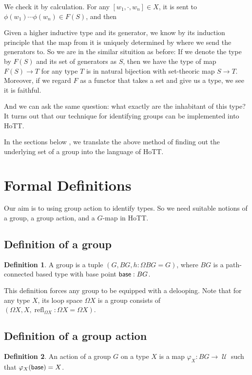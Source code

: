 \documentclass[11pt]{article}
\DeclareMathOperator{\refl}{refl}
\DeclareMathOperator{\cu}{\mathcal U}
\DeclareMathOperator{\base}{\sf base}
\theoremstyle{definition}
\newtheorem{definition}{Definition}[section]
\begin{document}
We check it by calculation. For any $[w_1,\cdot,w_n]\in X$, it is sent to $\phi(w_1)\cdots \phi(w_n)\in F(S)$, and then 


Given a higher inductive type and its generator, we know by its induction principle that the map from it is uniquely determined by where we send the generators to. So we are in the similar situition as before: If we denote the type by $F(S)$ and its set of generators as $S$, then we have the type of map $F(S)\to T$ for any type $T$ is in natural bijection with set-theoric map $S\to T$. Moreover, if we regard $F$ as a functor that takes a set and give us a type, we see it is faithful. 



And we can ask the same question: what exactly are the inhabitant of this type? It turns out that our technique for identifying groups can be implemented into HoTT.

In the sections below , we translate the above method of finding out the underlying set of a group into the language of HoTT.

\section{Formal Definitions}

Our aim is to using group action to identify types. So we need suitable notions of a group, a group action, and a $G$-map in HoTT.

\subsection{Definition of a group}

\begin{definition}
    A group is a tuple $(G,BG,h: \Omega BG = G)$, where $BG$ is a path-connected based type with base point $\base:BG$.
\end{definition}
This definition forces any group to be equipped with a delooping. Note that for any type $X$, its loop space $\Omega X$ is a group consists of $(\Omega X,X,\refl_{\Omega X}: \Omega X = \Omega X)$.

\subsection{Definition of a group action}

\begin{definition}
An action of a group $G$ on a type $X$ is a map $\varphi_X:BG\to \cu$ such that $\varphi_{X}(\base)=X$.
\end{definition}
\end{document}
